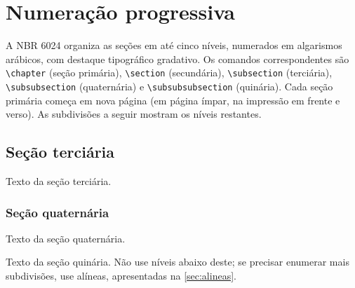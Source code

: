 \section{Numeração progressiva}\label{sec:numeracao}

A NBR 6024 \cite{abnt6024} organiza as seções em até cinco níveis, numerados em algarismos arábicos, com destaque tipográfico gradativo. Os comandos correspondentes são \verb|\chapter| (seção primária), \verb|\section| (secundária), \verb|\subsection| (terciária), \verb|\subsubsection| (quaternária) e \verb|\subsubsubsection| (quinária). Cada seção primária começa em nova página (em página ímpar, na impressão em frente e verso). As subdivisões a seguir mostram os níveis restantes.

\subsection{Seção terciária}\label{sec:terciaria}

Texto da seção terciária.

\subsubsection{Seção quaternária}\label{sec:quaternaria}

Texto da seção quaternária.

\label{sec:quinaria}

Texto da seção quinária. Não use níveis abaixo deste; se precisar enumerar mais subdivisões, use alíneas, apresentadas na \autoref{sec:alineas}.
